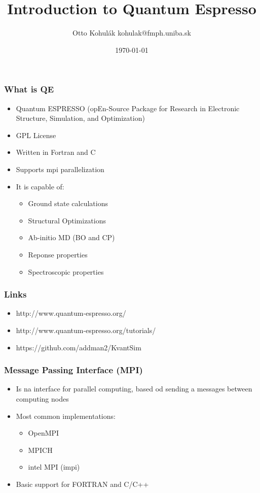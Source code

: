\documentclass{beamer}
\begin{document}
\title{Introduction to Quantum Espresso}   
\author{Otto Kohul\'{a}k \newline kohulak@fmph.uniba.sk} 
\date{\today} 

\frame{\titlepage} 

\begin{frame}
  \frametitle{What is QE}
  \begin{itemize}
    \item Quantum ESPRESSO (opEn-Source Package for Research in Electronic Structure, Simulation, and Optimization)
    \item GPL License
    \item Written in Fortran and C
    \item Supports mpi parallelization
    \item It is capable of:
    \begin{itemize}
      \item Ground state calculations
      \item Structural Optimizations
      \item Ab-initio MD (BO and CP)
      \item Reponse properties
      \item Spectroscopic properties
    \end{itemize}
  \end{itemize}
\end{frame}

\begin{frame}
  \frametitle{Links}
  \begin{itemize}
    \item http://www.quantum-espresso.org/
    \item http://www.quantum-espresso.org/tutorials/
    \item https://github.com/addman2/KvantSim
  \end{itemize}
\end{frame}

\begin{frame}
  \frametitle{Message Passing Interface (MPI)}
  \begin{itemize}
    \item Is na interface for parallel computing, based od sending a messages between computing nodes
    \item Most common implementations:
    \begin{itemize}
      \item OpenMPI
      \item MPICH
      \item intel MPI (impi)
    \end{itemize}
    \item Basic support for FORTRAN and C/C++
  \end{itemize}
\end{frame}
\end{document}
